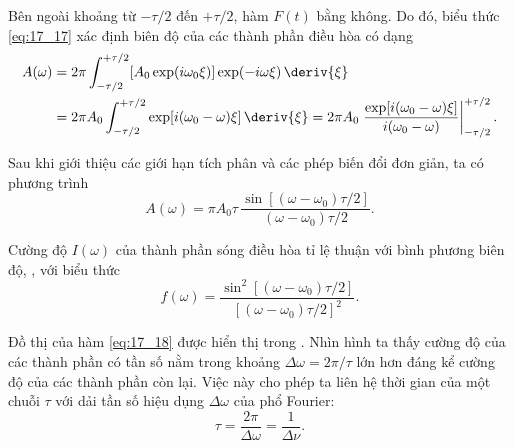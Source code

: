 Bên ngoài khoảng từ $-\tau/2$ đến $+\tau/2$, hàm $F(t)$ bằng không.
Do đó, biểu thức \eqref{eq:17_17} xác định biên độ của các thành phần điều hòa có dạng
\begin{align*}
    A(\omega) &= 2\pi \int_{-\tau/2}^{+\tau/2} [A_0 \exp(i\omega_0\xi)] \exp(-i\omega\xi)\, \deriv{\xi}\\
    &= 2\pi A_0 \int_{-\tau/2}^{+\tau/2} \exp[i(\omega_0-\omega)\xi]\, \deriv{\xi} = 2\pi A_0 \left.\frac{\exp[i(\omega_0-\omega)\xi]}{i(\omega_0-\omega)}\right|^{+\tau/2}_{-\tau/2}.
\end{align*}

\noindent
Sau khi giới thiệu các giới hạn tích phân và các phép biến đổi đơn giản, ta có phương trình
\begin{equation*}
    A(\omega) = \pi A_0 \tau\, \frac{\sin[(\omega-\omega_0)\tau/2]}{(\omega-\omega_0)\tau/2}.
\end{equation*}

Cường độ $I(\omega)$ của thành phần sóng điều hòa tỉ lệ thuận với bình phương biên độ, \ie, với biểu thức
\begin{equation}\label{eq:17_18}
    f(\omega) = \frac{\sin^2[(\omega-\omega_0)\tau/2]}{[(\omega-\omega_0)\tau/2]^2}.
\end{equation}

\noindent
Đồ thị của hàm \eqref{eq:17_18} được hiển thị trong .
Nhìn hình ta thấy cường độ của các thành phần có tần số nằm trong khoảng $\Delta{\omega} = 2\pi/\tau$ lớn hơn đáng kể cường độ của các thành phần còn lại.
Việc này cho phép ta liên hệ thời gian của một chuỗi $\tau$ với dải tần số hiệu dụng $\Delta{\omega}$ của phổ Fourier:
\begin{equation*}
    \tau = \frac{2\pi}{\Delta{\omega}} = \frac{1}{\Delta{\nu}}.
\end{equation*}

